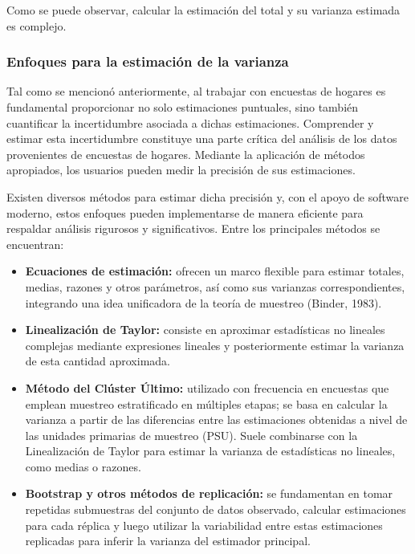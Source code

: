 \documentclass[
  12pt,
]{book}
\begin{document}
Como se puede observar, calcular la estimación del total y su varianza estimada es complejo.

\subsubsection{Enfoques para la estimación de la varianza}\label{enfoques-para-la-estimaciuxf3n-de-la-varianza}

Tal como se mencionó anteriormente, al trabajar con encuestas de hogares es fundamental proporcionar no solo estimaciones puntuales, sino también cuantificar la incertidumbre asociada a dichas estimaciones. Comprender y estimar esta incertidumbre constituye una parte crítica del análisis de los datos provenientes de encuestas de hogares. Mediante la aplicación de métodos apropiados, los usuarios pueden medir la precisión de sus estimaciones.

Existen diversos métodos para estimar dicha precisión y, con el apoyo de software moderno, estos enfoques pueden implementarse de manera eficiente para respaldar análisis rigurosos y significativos. Entre los principales métodos se encuentran:

\begin{itemize}
\item
  \textbf{Ecuaciones de estimación:} ofrecen un marco flexible para estimar totales, medias, razones y otros parámetros, así como sus varianzas correspondientes, integrando una idea unificadora de la teoría de muestreo (Binder, 1983).
\item
  \textbf{Linealización de Taylor:} consiste en aproximar estadísticas no lineales complejas mediante expresiones lineales y posteriormente estimar la varianza de esta cantidad aproximada.
\item
  \textbf{Método del Clúster Último:} utilizado con frecuencia en encuestas que emplean muestreo estratificado en múltiples etapas; se basa en calcular la varianza a partir de las diferencias entre las estimaciones obtenidas a nivel de las unidades primarias de muestreo (PSU). Suele combinarse con la Linealización de Taylor para estimar la varianza de estadísticas no lineales, como medias o razones.
\item
  \textbf{Bootstrap y otros métodos de replicación:} se fundamentan en tomar repetidas submuestras del conjunto de datos observado, calcular estimaciones para cada réplica y luego utilizar la variabilidad entre estas estimaciones replicadas para inferir la varianza del estimador principal.
\end{itemize}
\end{document}
